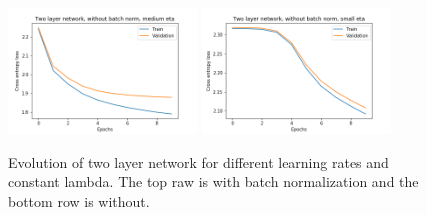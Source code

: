 \documentclass[10pt,a4paper]{article}
\begin{document}
\begin{figure}[H]
	\includegraphics[width=5cm]{res/part4-nobn_medium.png}
	\includegraphics[width=5cm]{res/part4-nobn_small.png}
	\caption{Evolution of two layer network for different learning rates and constant lambda. The top raw
	is with batch normalization and the bottom row is without.}
\end{figure}
\end{document}
